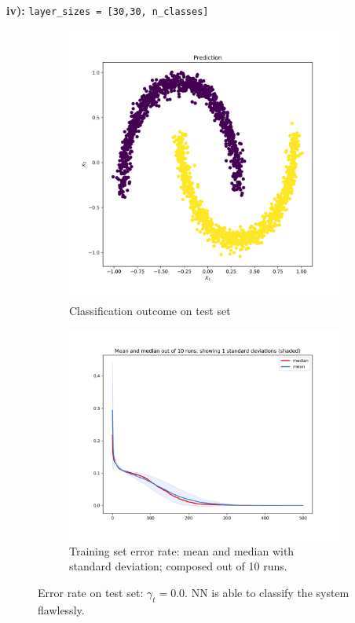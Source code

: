 \documentclass[12pt]{article}
\begin{document}
\newline
\noindent \textbf{iv):} \texttt{layer\_sizes = [30,30, n\_classes]} \\
\begin{figure}[h!]
\captionsetup[subfigure]{labelformat=empty}
\centering
	\begin{subfigure}{.48\textwidth}
	\centering
	\includegraphics[scale=0.30]{pics/Prediction_4}
	\caption{Classification outcome on test set}
	\label{fig:iv_a}
	\end{subfigure}
	\begin{subfigure}{.48\textwidth}
	\centering
	\includegraphics[scale=0.30]{pics/iv_ens}
	\caption{Training set error rate: mean and median with standard deviation; composed out of 10 runs.}
	\label{fig:iv_b}
	\end{subfigure}
\caption{Error rate on test set: $\gamma_t = 0.0$. NN is able to classify the system flawlessly.}
\label{fig:res_iv}
\end{figure}
\end{document}
